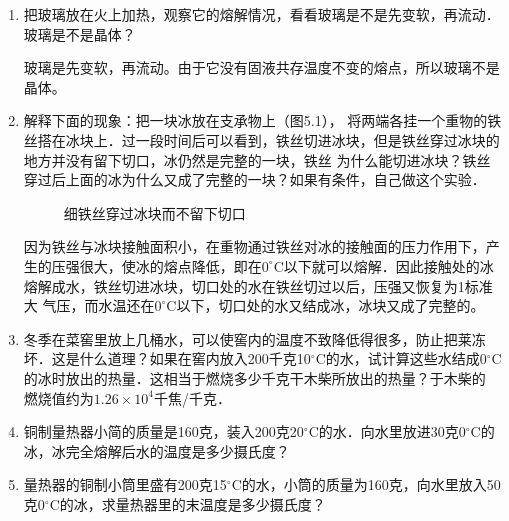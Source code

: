 \begin{enumerate}
    \item 把玻璃放在火上加热，观察它的熔解情况，看看玻璃是不是先变软，再流动．玻璃是不是晶体？
    
\begin{solution}
 玻璃是先变软，再流动。由于它没有固液共存温度不变的熔点，所以玻璃不是晶体。
\end{solution}
    \item 解释下面的现象：把一块冰放在支承物上（图5.1），
    将两端各挂一个重物的铁丝搭在冰块上．过一段时间后可以看到，铁丝切进冰块，但是铁丝穿过冰块的地方并没有留下切口，冰仍然是完整的一块，铁丝
    为什么能切进冰块？铁丝穿过后上面的冰为什么又成了完整的一块？如果有条件，自己做这个实验．
\begin{figure}[htp]
\centering
\caption{细铁丝穿过冰块而不留下切口
}
\end{figure}
    
\begin{solution}
因为铁丝与冰块接触面积小，在重物通过铁丝对冰的接触面的压力作用下，产生的压强很大，使冰的熔点降低，即在$0^\circ$C以下就可以熔解．因此接触处的冰熔解成水，铁丝切进冰块，切口处的水在铁丝切过以后，压强又恢复为1标准大
气压，而水温还在$0^\circ$C以下，切口处的水又结成冰，冰块又成了完整的。
\end{solution}
    \item   冬季在菜窖里放上几桶水，可以使窖内的温度不致降低得很多，防止把莱冻坏．这是什么道理？如果在窖内放入200千克10$^\circ$C的水，试计算这些水结成0$^\circ$C的冰时放出的热量．这相当于燃烧多少千克干木柴所放出的热量？于木柴的
    燃烧值约为$1.26\times 10^4$千焦/千克．
    
    \begin{solution}
      
    \end{solution}
\item  铜制量热器小简的质量是160克，装入200克20$^\circ$C的水．向水里放进30克0$^\circ$C的冰，冰完全熔解后水的温度是多少摄氏度？
    
\begin{solution}
  
\end{solution}
\item  量热器的铜制小筒里盛有200克15$^\circ$C的水，小筒的质量为160克，向水里放入50克0$^\circ$C的冰，求量热器里的末温度是多少摄氏度？
    
\begin{solution}
  
\end{solution}
\end{enumerate}


